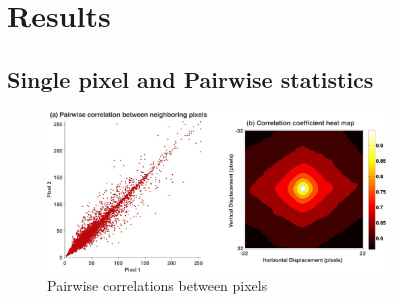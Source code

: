 \documentclass[10pt,twocolumn,letterpaper]{article}
\begin{document}





\section{Results}

\subsection{Single pixel and Pairwise statistics}
\begin{figure}[h]
\begin{center}
   \includegraphics[width=0.8\textwidth]{corr.jpg}
   \caption{Pairwise correlations between pixels}
    \label{fig:pairwise}
\end{center}
\end{figure}
\end{document}
